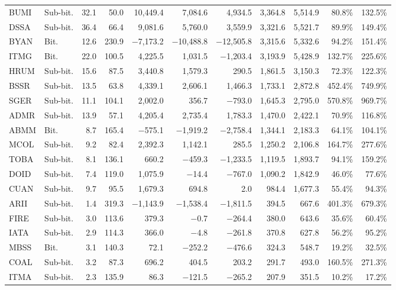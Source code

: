 \begin{landscape}
\begin{longtable}{llrrrrrrrrr}
BUMI & Sub-bit. & 32.1 & 50.0 & 10,449.4 & 7,084.6 & 4,934.5 & 3,364.8 & 5,514.9 & 80.8\% & 132.5\% \\
DSSA & Sub-bit. & 36.4 & 66.4 & 9,081.6 & 5,760.0 & 3,559.9 & 3,321.6 & 5,521.7 & 89.9\% & 149.4\% \\
BYAN & Bit. & 12.6 & 230.9 & $-$7,173.2 & $-$10,488.8 & $-$12,505.8 & 3,315.6 & 5,332.6 & 94.2\% & 151.4\% \\
ITMG & Bit. & 22.0 & 100.5 & 4,225.5 & 1,031.5 & $-$1,203.4 & 3,193.9 & 5,428.9 & 132.7\% & 225.6\% \\
HRUM & Sub-bit. & 15.6 & 87.5 & 3,440.8 & 1,579.3 & 290.5 & 1,861.5 & 3,150.3 & 72.3\% & 122.3\% \\
BSSR & Sub-bit. & 13.5 & 63.8 & 4,339.1 & 2,606.1 & 1,466.3 & 1,733.1 & 2,872.8 & 452.4\% & 749.9\% \\
SGER & Sub-bit. & 11.1 & 104.1 & 2,002.0 & 356.7 & $-$793.0 & 1,645.3 & 2,795.0 & 570.8\% & 969.7\% \\
ADMR & Sub-bit. & 13.9 & 57.1 & 4,205.4 & 2,735.4 & 1,783.3 & 1,470.0 & 2,422.1 & 70.9\% & 116.8\% \\
ABMM & Bit. & 8.7 & 165.4 & $-$575.1 & $-$1,919.2 & $-$2,758.4 & 1,344.1 & 2,183.3 & 64.1\% & 104.1\% \\
MCOL & Sub-bit. & 9.2 & 82.4 & 2,392.3 & 1,142.1 & 285.5 & 1,250.2 & 2,106.8 & 164.7\% & 277.6\% \\
TOBA & Sub-bit. & 8.1 & 136.1 & 660.2 & $-$459.3 & $-$1,233.5 & 1,119.5 & 1,893.7 & 94.1\% & 159.2\% \\
DOID & Sub-bit. & 7.4 & 119.0 & 1,075.9 & $-$14.4 & $-$767.0 & 1,090.2 & 1,842.9 & 46.0\% & 77.6\% \\
CUAN & Sub-bit. & 9.7 & 95.5 & 1,679.3 & 694.8 & 2.0 & 984.4 & 1,677.3 & 55.4\% & 94.3\% \\
ARII & Sub-bit. & 1.4 & 319.3 & $-$1,143.9 & $-$1,538.4 & $-$1,811.5 & 394.5 & 667.6 & 401.3\% & 679.3\% \\
FIRE & Sub-bit. & 3.0 & 113.6 & 379.3 & $-$0.7 & $-$264.4 & 380.0 & 643.6 & 35.6\% & 60.4\% \\
IATA & Sub-bit. & 2.9 & 114.3 & 366.0 & $-$4.8 & $-$261.8 & 370.8 & 627.8 & 56.2\% & 95.2\% \\
MBSS & Bit. & 3.1 & 140.3 & 72.1 & $-$252.2 & $-$476.6 & 324.3 & 548.7 & 19.2\% & 32.5\% \\
COAL & Sub-bit. & 3.2 & 87.3 & 696.2 & 404.5 & 203.2 & 291.7 & 493.0 & 160.5\% & 271.3\% \\
ITMA & Sub-bit. & 2.3 & 135.9 & 86.3 & $-$121.5 & $-$265.2 & 207.9 & 351.5 & 10.2\% & 17.2\% \\

\end{longtable}
\end{landscape}

